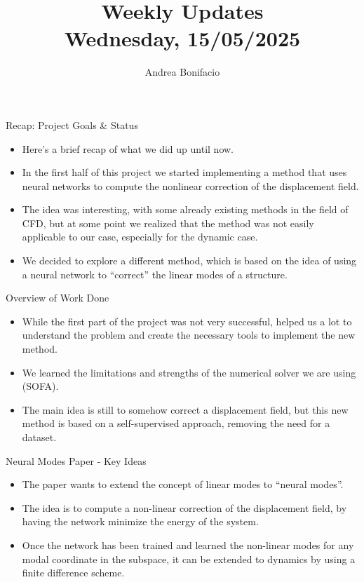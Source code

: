 \documentclass{beamer}
\title{Weekly Updates\\
\tiny{Wednesday, 15/05/2025}}
\author{Andrea Bonifacio}
\date{}
\begin{document}
\begin{frame}
\titlepage
\end{frame}

\begin{frame}{Recap: Project Goals \& Status}
    \begin{itemize}
        \item Here's a brief recap of what we did up until now.
        \item In the first half of this project we started implementing a method that uses neural networks to compute the nonlinear correction of the displacement field.
        \item The idea was interesting, with some already existing methods in the field of CFD, but at some point we realized that the method was not easily applicable to our case, especially for the dynamic case.
        \item We decided to explore a different method, which is based on the idea of using a neural network to ``correct'' the linear modes of a structure.
    \end{itemize}
\end{frame}

\begin{frame}{Overview of Work Done}
    \begin{itemize}
        \item While the first part of the project was not very successful, helped us a lot to understand the problem and create the necessary tools to implement the new method.
        \item We learned the limitations and strengths of the numerical solver we are using (SOFA).
        \item The main idea is still to somehow correct a displacement field, but this new method is based on a self-supervised approach, removing the need for a dataset.
    \end{itemize}
\end{frame}



\begin{frame}{Neural Modes Paper - Key Ideas}
    \begin{itemize}
        \item The paper wants to extend the concept of linear modes to ``neural modes''.
        \item The idea is to compute a non-linear correction of the displacement field, by having the network minimize the energy of the system.
        \item Once the network has been trained and learned the non-linear modes for any modal coordinate in the subspace, it can be extended to dynamics by using a finite difference scheme.
    \end{itemize}
\end{frame}
\end{document}
